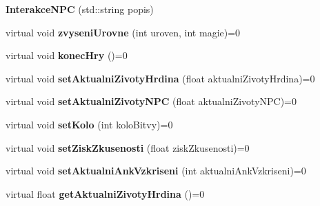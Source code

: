\begin{DoxyCompactItemize}
\item 
\hypertarget{class_interakce_n_p_c_a8a3e46b0711b56ff4e47bd38d7135b16}{{\bfseries Interakce\-N\-P\-C} (std\-::string popis)}\label{class_interakce_n_p_c_a8a3e46b0711b56ff4e47bd38d7135b16}

\item 
\hypertarget{class_interakce_n_p_c_ad6778a37204d268747fdc7c872188a67}{virtual void {\bfseries zvyseni\-Urovne} (int uroven, int magie)=0}\label{class_interakce_n_p_c_ad6778a37204d268747fdc7c872188a67}

\item 
\hypertarget{class_interakce_n_p_c_acf85e67f3edea664e89aea0c9e748988}{virtual void {\bfseries konec\-Hry} ()=0}\label{class_interakce_n_p_c_acf85e67f3edea664e89aea0c9e748988}

\item 
\hypertarget{class_interakce_n_p_c_af0969307332dbe21a19fc541dd8a51ed}{virtual void {\bfseries set\-Aktualni\-Zivoty\-Hrdina} (float aktualni\-Zivoty\-Hrdina)=0}\label{class_interakce_n_p_c_af0969307332dbe21a19fc541dd8a51ed}

\item 
\hypertarget{class_interakce_n_p_c_a05270c05bb94b9b3f38192344ec9140b}{virtual void {\bfseries set\-Aktualni\-Zivoty\-N\-P\-C} (float aktualni\-Zivoty\-N\-P\-C)=0}\label{class_interakce_n_p_c_a05270c05bb94b9b3f38192344ec9140b}

\item 
\hypertarget{class_interakce_n_p_c_aa01b2a8f9f799eca401cdca920036832}{virtual void {\bfseries set\-Kolo} (int kolo\-Bitvy)=0}\label{class_interakce_n_p_c_aa01b2a8f9f799eca401cdca920036832}

\item 
\hypertarget{class_interakce_n_p_c_a643ff98c7461ba7bd64dea6683eb5a4e}{virtual void {\bfseries set\-Zisk\-Zkusenosti} (float zisk\-Zkusenosti)=0}\label{class_interakce_n_p_c_a643ff98c7461ba7bd64dea6683eb5a4e}

\item 
\hypertarget{class_interakce_n_p_c_a63685a203de76d53f3fb298704967ffa}{virtual void {\bfseries set\-Aktualni\-Ank\-Vzkriseni} (int aktualni\-Ank\-Vzkriseni)=0}\label{class_interakce_n_p_c_a63685a203de76d53f3fb298704967ffa}

\item 
\hypertarget{class_interakce_n_p_c_a866583ea0b77c5a66f690567df6d56cb}{virtual float {\bfseries get\-Aktualni\-Zivoty\-Hrdina} ()=0}\label{class_interakce_n_p_c_a866583ea0b77c5a66f690567df6d56cb}


\end{DoxyCompactItemize}
